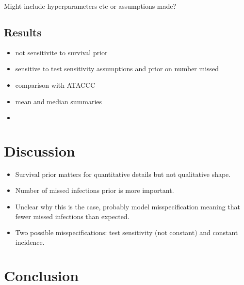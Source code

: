 \documentclass[thesis.tex]{subfiles}
\begin{document}
Might include hyperparameters etc or assumptions made?

\subsection{Results}


\begin{itemize}
    \item not sensitivite to survival prior
    \item sensitive to test sensitivity assumptions and prior on number missed
    \item comparison with ATACCC
    \item mean and median summaries
    \item 
\end{itemize}

\section{Discussion} \label{imperf-test:sec:discussion}


\begin{itemize}
  \item Survival prior matters for quantitative details but not qualitative shape. 
  \item Number of missed infections prior is more important.
  \item Unclear why this is the case, probably model misspecification meaning that fewer missed infections than expected.
  \item Two possible misspecifications: test sensitivity (not constant) and constant incidence.
\end{itemize}

\section{Conclusion} \label{imperf-test:sec:conclusion}


\ifSubfilesClassLoaded{
  \listoftodos
}{}
\end{document}
